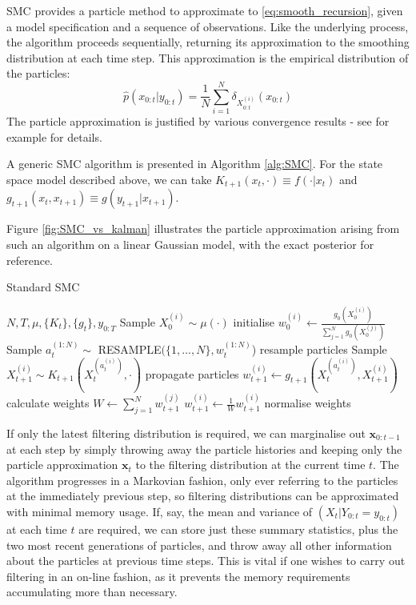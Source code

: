 \documentclass[fleqn]{article}
\theoremstyle{definition}
\newcommand{\wt}[2][t]{w_{#1}^{(#2)}}
\begin{document}
SMC provides a particle method to approximate to \eqref{eq:smooth_recursion}, given a model specification and a sequence of observations. Like the underlying process, the algorithm proceeds sequentially, returning its approximation to the smoothing distribution at each time step.
This approximation is the empirical distribution of the particles:
\begin{equation}
\hat{p}(x_{0:t}|y_{0:t}) = \frac{1}{N} \sum_{i=1}^N \delta_{X_{0:t}^{(i)}} (x_{0:t})
\end{equation}
The particle approximation is justified by various convergence results - see for example \citet{delmoral2013} for details.

A generic SMC algorithm is presented in Algorithm \ref{alg:SMC}. For the state space model described above, we can take $K_{t+1}(x_t, \cdot) \equiv f(\cdot | x_t)$ and $g_{t+1}(x_t, x_{t+1}) \equiv g(y_{t+1} | x_{t+1})$.

Figure \ref{fig:SMC_vs_kalman} illustrates the particle approximation arising from such an algorithm on a linear Gaussian model, with the exact posterior for reference.

\begin{algorithm}
\caption{Standard SMC}\label{alg:SMC}
\begin{algorithmic}[1]
\Require $N, T, \mu, \{K_t\}, \{g_t\}, y_{0:T}$
	\State Sample $X_0^{(i)} \sim \mu(\cdot)$  \Comment initialise
	\State $w_0^{(i)} \gets \frac{g_0(X_0^{(i)})}{\sum_{j=1}^N g_0(X_0^{(j)})}$
\EndFor
{}
	\State Sample $a_t^{(1:N)} \sim $ {\footnotesize RESAMPLE}$(\{1,\dots ,N\}, \wt{1:N}$) \Comment resample particles
		\State Sample $X_{t+1}^{(i)} \sim K_{t+1}(X_t^{(a_t^{(i)})}, \cdot)$ \Comment propagate particles
		\State $w_{t+1}^{(i)} \gets g_{t+1}(X_t^{(a_t^{(i)})} , X_{t+1}^{(i)})$ \Comment calculate weights
	\EndFor
	\State $W \gets \sum_{j=1}^N w_{t+1}^{(j)}$
		\State $w_{t+1}^{(i)} \gets \frac{1}{W}w_{t+1}^{(i)}$ \Comment normalise weights
	\EndFor
\EndFor
\end{algorithmic}
\end{algorithm}

If only the latest filtering distribution is required, we can marginalise out $\mathbf{x}_{0:t-1}$ at each step by simply throwing away the particle histories and keeping only the particle approximation $\mathbf{x}_{t}$ to the filtering distribution at the current time $t$. 
The algorithm progresses in a Markovian fashion, only ever referring to the particles at the immediately previous step, so filtering distributions can be approximated with minimal memory usage. 
If, say, the mean and variance of $(X_{t} | Y_{0:t} = y_{0:t})$ at each time $t$ are required, we can store just these summary statistics, plus the two most recent generations of particles, and throw away all other information about the particles at previous time steps. This is vital if one wishes to carry out filtering in an on-line fashion, as it prevents the memory requirements accumulating more than necessary.
\end{document}
